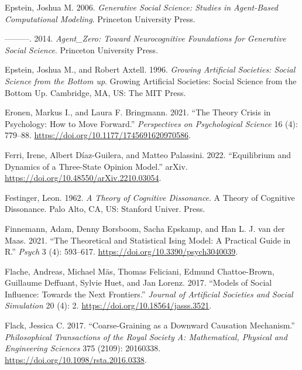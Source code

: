 \documentclass[
  a4paper,
  DIV=11,
  numbers=noendperiod,
  oneside]{scrreprt}
\newlength{\cslhangindent}
\newlength{\cslentryspacingunit} %
\newenvironment{CSLReferences}[2] %
 {%
  \setlength{\parindent}{0pt}
  \ifodd #1
  \let\oldpar\par
  \def\par{\hangindent=\cslhangindent\oldpar}
  \fi
  \setlength{\parskip}{#2\cslentryspacingunit}
 }%
 {}
\begin{document}
\begin{CSLReferences}{1}{0}
\leavevmode{}%
Epstein, Joshua M. 2006. \emph{Generative {Social Science}: {Studies} in
{Agent-Based Computational Modeling}}. {Princeton University Press}.

\leavevmode{}%
---------. 2014. \emph{Agent\_{Zero}: {Toward Neurocognitive
Foundations} for {Generative Social Science}}. {Princeton University
Press}.

\leavevmode{}%
Epstein, Joshua M., and Robert Axtell. 1996. \emph{Growing Artificial
Societies: {Social} Science from the Bottom up}. Growing Artificial
Societies: {Social} Science from the Bottom Up. {Cambridge, MA, US}:
{The MIT Press}.

\leavevmode{}%
Eronen, Markus I., and Laura F. Bringmann. 2021. {``The {Theory Crisis}
in {Psychology}: {How} to {Move Forward}.''} \emph{Perspectives on
Psychological Science} 16 (4): 779--88.
\url{https://doi.org/10.1177/1745691620970586}.

\leavevmode{}%
Ferri, Irene, Albert Díaz-Guilera, and Matteo Palassini. 2022.
{``Equilibrium and Dynamics of a Three-State Opinion Model.''} {arXiv}.
\url{https://doi.org/10.48550/arXiv.2210.03054}.

\leavevmode{}%
Festinger, Leon. 1962. \emph{A Theory of Cognitive Dissonance}. A Theory
of Cognitive Dissonance. {Palo Alto, CA, US}: {Stanford Univer. Press}.

\leavevmode{}%
Finnemann, Adam, Denny Borsboom, Sacha Epskamp, and Han L. J. van der
Maas. 2021. {``The Theoretical and Statistical Ising Model: A Practical
Guide in R.''} \emph{Psych} 3 (4): 593--617.
\url{https://doi.org/10.3390/psych3040039}.

\leavevmode{}%
Flache, Andreas, Michael Mäs, Thomas Feliciani, Edmund Chattoe-Brown,
Guillaume Deffuant, Sylvie Huet, and Jan Lorenz. 2017. {``Models of
{Social Influence}: {Towards} the {Next Frontiers}.''} \emph{Journal of
Artificial Societies and Social Simulation} 20 (4): 2.
\url{https://doi.org/10.18564/jasss.3521}.

\leavevmode{}%
Flack, Jessica C. 2017. {``Coarse-Graining as a Downward Causation
Mechanism.''} \emph{Philosophical Transactions of the Royal Society A:
Mathematical, Physical and Engineering Sciences} 375 (2109): 20160338.
\url{https://doi.org/10.1098/rsta.2016.0338}.


\end{CSLReferences}
\end{document}
